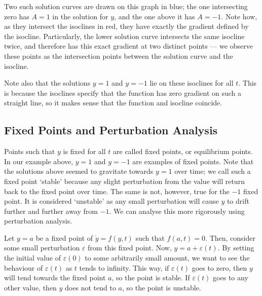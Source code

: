 \documentclass{article}
\begin{document}
Two such solution curves are drawn on this graph in blue; the one intersecting zero has $A = 1$ in the solution for $y$, and the one above it has $A = -1$. Note how, as they intersect the isoclines in red, they have exactly the gradient defined by the isocline. Particularly, the lower solution curve intersects the same isocline twice, and therefore has this exact gradient at two distinct points --- we observe these points as the intersection points between the solution curve and the isocline.

Note also that the solutions $y = 1$ and $y = -1$ lie on these isoclines for all $t$. This is because the isoclines specify that the function has zero gradient on such a straight line, so it makes sense that the function and isocline coincide.

\subsection{Fixed Points and Perturbation Analysis}
Points such that $y$ is fixed for all $t$ are called fixed points, or equilibrium points. In our example above, $y=1$ and $y=-1$ are examples of fixed points. Note that the solutions above seemed to gravitate towards $y=1$ over time; we call such a fixed point `stable' because any slight perturbation from the value will return back to the fixed point over time. The same is not, however, true for the $-1$ fixed point. It is considered `unstable' as any small perturbation will cause $y$ to drift further and further away from $-1$. We can analyse this more rigorously using perturbation analysis.

Let $y = a$ be a fixed point of $\dot y = f(y, t)$ such that $f(a, t) = 0$. Then, consider some small perturbation $\varepsilon$ from this fixed point. Now, $y = a + \varepsilon(t)$. By setting the initial value of $\varepsilon(0)$ to some arbitrarily small amount, we want to see the behaviour of $\varepsilon(t)$ as $t$ tends to infinity. This way, if $\varepsilon(t)$ goes to zero, then $y$ will tend towards the fixed point $a$, so the point is stable. If $\varepsilon(t)$ goes to any other value, then $y$ does not tend to $a$, so the point is unstable.
\end{document}
